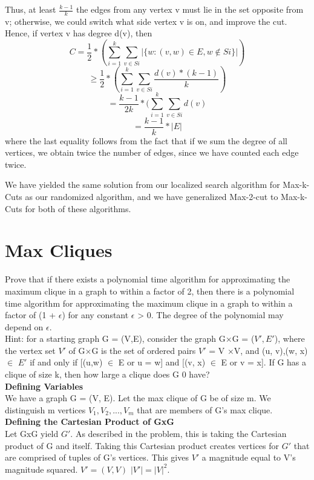 \documentclass[11pt, solution, letterpaper]{format}
\begin{document}
Thus, at least $\frac{k - 1}{k}$ the edges from any vertex v must lie in the set opposite
from v; otherwise, we could switch what side vertex v is on, and improve the cut. Hence, if vertex v has degree d(v),
then
$$C =\frac{1}{2} * (\sum_{i = 1}^{k} \sum_{v\in Si} |\{w: (v, w) \in E, w \not\in Si \}|)$$
$$\geq \frac{1}{2} * (\sum_{i = 1}^{k}\sum_{v\in Si} \frac{d(v)*(k-1)}{k} )$$
$$=\frac{k-1}{2k} * (\sum_{i = 1}^{k}\sum_{v\in Si} d(v) $$ 
$$ = \frac{k-1}{k}*|E|$$
where the last equality follows from the fact that if we sum the degree of all vertices, we obtain twice the number of
edges, since we have counted each edge twice.

We have yielded the same solution from our localized search algorithm for Max-k-Cuts as our randomized algorithm, and we have generalized Max-2-cut to Max-k-Cuts for both of these algorithms.


\clearpage
\section{Max Cliques}
 Prove that if there exists a polynomial time algorithm for approximating the maximum clique in a graph to within a factor of 2, then there is a polynomial time algorithm for approximating the maximum clique in a graph to within a factor of (1 + $\epsilon$) for any constant $\epsilon$ > 0. The degree of the polynomial may depend on $\epsilon$.\\
 
 Hint: for a starting graph G = (V,E), consider the graph G×G = ($V',E'$), where the vertex set $V'$ of G×G is the set of ordered pairs $V'$ = V ×V, and {(u, v),(w, x)} $\in$ $E'$ if and only if [{(u,w)} $\in$ E or u = w] and [{(v, x)} $\in$ E or v = x]. If G has a clique of size k, then how large a clique does G 0 have?\\

\textbf{Defining Variables}\\
We have a graph G = (V, E). Let the max clique of G be of size m. We distinguish m vertices $V_1, V_2, ... , V_m$ that are members of G's max clique.\\

\textbf{Defining the Cartesian Product of GxG}\\
Let GxG yield $G'$. As described in the problem, this is taking the Cartesian product of G and itself. Taking this Cartesian product creates vertices for $G'$ that are comprised of tuples of G's vertices. This gives $V'$ a magnitude equal to V's magnitude squared.  $V' = (V, V)$ $|V'| = |V|^2$. \\
\end{document}
